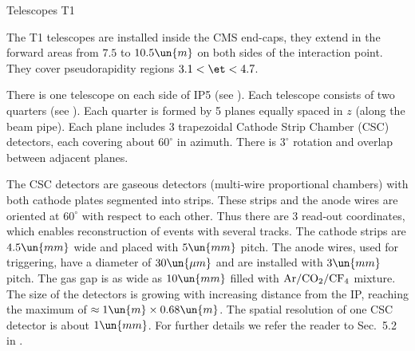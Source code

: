 
\caption{Telescopes T1}

The T1 telescopes are installed inside the CMS end-caps, they extend in the forward areas from $7.5$ to $10.5\un{m}$ on both sides of the interaction point. They cover pseudorapidity regions $3.1 < \et < 4.7$.

There is one telescope on each side of IP5 (see ). Each telescope consists of two quarters (see ). Each quarter is formed by 5 planes equally spaced in $z$ (along the beam pipe). Each plane includes 3 trapezoidal Cathode Strip Chamber (CSC) detectors, each covering about $60^\circ$ in azimuth. There is $3^\circ$ rotation and overlap between adjacent planes.

\bmfig
{}
\emfig

The CSC detectors are gaseous detectors (multi-wire proportional chambers) with both cathode plates segmented into strips. These strips and the anode wires are oriented at $60^\circ$ with respect to each other. Thus there are 3 read-out coordinates, which enables reconstruction of events with several 
tracks. The cathode strips are $4.5\un{mm}$ wide and placed with $5\un{mm}$ pitch. The anode wires, used for triggering, have a diameter of $30\un{\mu m}$ and are installed with $3\un{mm}$ pitch. The gas gap is as wide as $10\un{mm}$ filled with $\rm Ar/CO_2/CF_4$ mixture. The size of the detectors is growing with increasing distance from the IP, reaching the maximum of $\approx 1\un{m} \times 0.68\un{m}$. The spatial resolution of one CSC detector is about $1\un{mm}$. For further details we refer the reader to Sec.~5.2 in .



